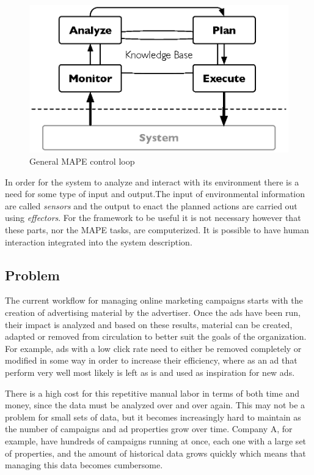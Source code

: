 \documentclass{sig-alternate}
\begin{document}
\begin{figure}[htb]
	\centering
	\includegraphics[width=\columnwidth]{mape.eps}
	\caption{General MAPE control loop}
	\label{fig:MAPE}
\end{figure}

In order for the system to analyze and interact with its environment there is a need for some type of input and output.The input of environmental information are called \textit{sensors} and the output to enact the planned actions are carried out using \textit{effectors}. For the framework to be useful it is not necessary however that these parts, nor the MAPE tasks, are computerized. It is possible to have human interaction integrated into the system description.

\subsection{Problem}
The current workflow for managing online marketing campaigns starts with the creation of advertising material by the advertiser. Once the ads have been run, their impact is analyzed and based on these results, material can be created, adapted or removed from circulation to better suit the goals of the organization. For example, ads with a low click rate need to either be removed completely or modified in some way in order to increase their efficiency, where as an ad that perform very well most likely is left as is and used as inspiration for new ads.

There is a high cost for this repetitive manual labor in terms of both time and money, since the data must be analyzed over and over again. This may not be a problem for small sets of data, but it becomes increasingly hard to maintain as the number of campaigns and ad properties grow over time. Company A, for example, have hundreds of campaigns running at once, each one with a large set of properties, and the amount of historical data grows quickly which means that managing this data becomes cumbersome.
\end{document}
